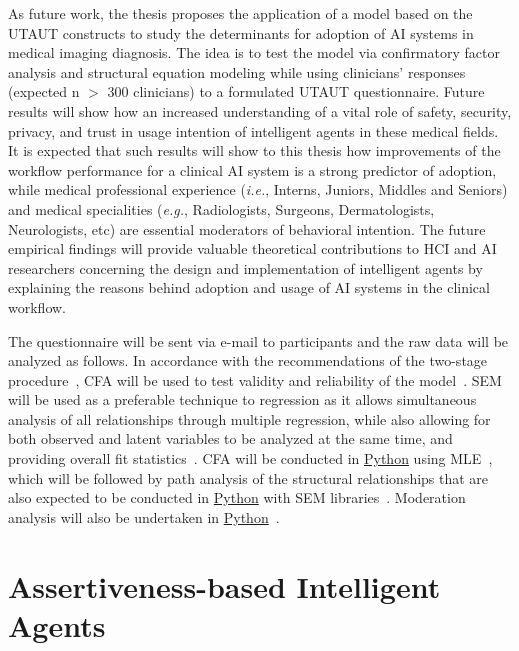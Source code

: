 As future work, the thesis proposes the application of a model based on the \ac{UTAUT} constructs to study the determinants for adoption of \ac{AI} systems in medical imaging diagnosis.
The idea is to test the model via confirmatory factor analysis and structural equation modeling while using clinicians' responses (expected n $>$ 300 clinicians) to a formulated \ac{UTAUT} questionnaire.
Future results will show how an increased understanding of a vital role of safety, security, privacy, and trust in usage intention of intelligent agents in these medical fields.
It is expected that such results will show to this thesis how improvements of the workflow performance for a clinical \ac{AI} system is a strong predictor of adoption, while medical professional experience ({\it i.e.}, Interns, Juniors, Middles and Seniors) and medical specialities ({\it e.g.}, Radiologists, Surgeons, Dermatologists, Neurologists, etc) are essential moderators of behavioral intention.
The future empirical findings will provide valuable theoretical contributions to \ac{HCI} and \ac{AI} researchers concerning the design and implementation of intelligent agents by explaining the reasons behind adoption and usage of \ac{AI} systems in the clinical workflow.

The questionnaire will be sent via e-mail to participants and the raw data will be analyzed as follows.
In accordance with the recommendations of the two-stage procedure~\cite{rahi2018investigating}, \ac{CFA} will be used to test validity and reliability of the model~\cite{crede2019questionable}.
\ac{SEM} will be used as a preferable technique to regression as it allows simultaneous analysis of all relationships through multiple regression, while also allowing for both observed and latent variables to be analyzed at the same time, and providing overall fit statistics~\cite{hair2017advanced}.
\ac{CFA} will be conducted in \href{https://www.python.org/}{Python} using \ac{MLE}~\cite{cham2017full}, which will be followed by path analysis of the structural relationships that are also expected to be conducted in \href{https://www.python.org/}{Python} with \ac{SEM} libraries~\cite{igolkina2020semopy}.
Moderation analysis will also be undertaken in \href{https://www.python.org/}{Python}~\cite{hayes2017regression}.

\section{Assertiveness-based Intelligent Agents}
\label{sec:chap008002}

